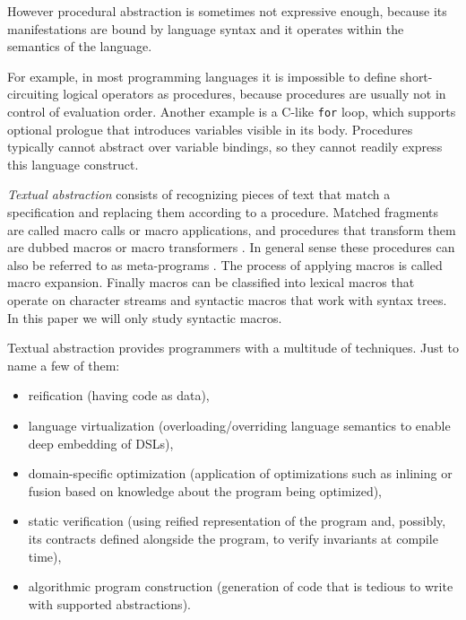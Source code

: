 \documentclass[10pt,journal,a4paper]{IEEEtran}
\begin{document}
However procedural abstraction is sometimes not expressive enough, because
its manifestations are bound by language syntax and it operates within the semantics
of the language.

For example, in most programming languages it is impossible to define short-circuiting logical operators
as procedures, because procedures are usually not in control of evaluation order.
Another example is a C-like \small \texttt{for} \normalsize loop, which supports
optional prologue that introduces variables visible in its body. Procedures typically cannot abstract
over variable bindings, so they cannot readily express this language construct.


\emph{Textual abstraction} consists of recognizing pieces of text
that match a specification and replacing them according
to a procedure.
Matched fragments are called macro calls or macro applications, and
procedures that transform them are dubbed macros or macro transformers \cite{kohlbecker86}.
In general sense these procedures can also be referred to as meta-programs \cite{sheard01}.
The process of applying macros is called macro expansion.
Finally macros can be classified into lexical macros that
operate on character streams and syntactic macros that work with syntax trees.
In this paper we will only study syntactic macros.

Textual abstraction provides programmers with a multitude of techniques.
Just to name a few of them:
\begin{itemize}
\item reification (having code as data),
\item language virtualization (overloading/overriding language semantics
to enable deep embedding of DSLs),
\item domain-specific optimization (application of optimizations such as inlining
or fusion based on knowledge about the program being optimized),
\item static verification (using reified representation of the program
and, possibly, its contracts defined alongside the program, to verify invariants
at compile time),
\item algorithmic program construction (generation of code that is tedious to write with
supported abstractions).
\end{itemize}
\end{document}
